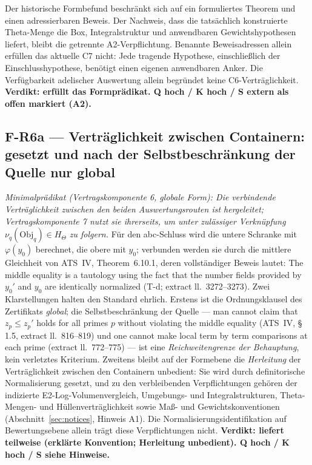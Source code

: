 \documentclass[11pt,a4paper]{article}
\begin{document}
Der historische Formbefund beschränkt sich auf ein formuliertes
Theorem und einen adressierbaren Beweis. Der Nachweis, dass die
tatsächlich konstruierte Theta-Menge die Box, Integralstruktur und
anwendbaren Gewichtshypothesen liefert, bleibt die getrennte
A2-Verpflichtung. Benannte Beweisadressen allein erfüllen das aktuelle
C7 nicht: Jede tragende Hypothese, einschließlich der
Einschlusshypothese, benötigt einen eigenen anwendbaren Anker.
Die Verfügbarkeit adelischer Auswertung allein begründet keine
C6-Verträglichkeit.
\textbf{Verdikt: erfüllt das Formprädikat. Q hoch / K hoch / S extern als
offen markiert (A2).}

\subsection{F-R6a --- Verträglichkeit zwischen Containern: gesetzt und nach der
Selbstbeschränkung der Quelle nur global}\label{sec:r6cc}

\emph{Minimalprädikat (Vertragskomponente 6, globale Form): Die verbindende
Verträglichkeit zwischen den beiden Auswertungsrouten ist hergeleitet;
Vertragskomponente 7 nutzt sie ihrerseits, um unter zulässiger Verknüpfung
$\nu_q(\mathrm{Obj}_q) \in H_\Theta$ zu folgern.} Für den abc-Schluss wird die
untere Schranke mit $\varphi(y_0)$ berechnet, die obere mit $y_0$; verbunden
werden sie durch die mittlere Gleichheit von ATS~IV, Theorem~6.10.1, deren
vollständiger Beweis lautet: \glqq The middle equality is a tautology using the
fact that the number fields provided by $y_0'$ and $y_0$ are identically
normalized\grqq{} (T-d; extract ll.~3272--3273). Zwei Klarstellungen halten den
Standard ehrlich. Erstens ist die Ordnungsklausel des Zertifikats
\emph{global}; die Selbstbeschränkung der Quelle --- man \glqq cannot claim that
$z_p \le z_p'$ holds for all primes $p$ without violating the middle
equality\grqq{} (ATS~IV, \S\,1.5, extract ll.~816--819) und \glqq one cannot make local
term by term comparisons at each prime\grqq{} (extract ll.~772--775) --- ist eine
\emph{Reichweitengrenze der Behauptung}, kein verletztes Kriterium. Zweitens
bleibt auf der Formebene die \emph{Herleitung} der Verträglichkeit zwischen den
Containern unbedient: Sie wird durch definitorische Normalisierung gesetzt, und
zu den verbleibenden Verpflichtungen gehören der indizierte
E2-Log-Volumenvergleich, Umgebungs- und Integralstrukturen,
Theta-Mengen- und Hüllenverträglichkeit sowie Maß- und
Gewichtskonventionen (Abschnitt~\ref{sec:notices}, Hinweis A1).
Die Normalisierungsidentifikation auf Bewertungsebene allein
trägt diese Verpflichtungen nicht.
\textbf{Verdikt: liefert teilweise (erklärte Konvention; Herleitung
unbedient). Q hoch / K hoch / S siehe Hinweise.}
\end{document}
